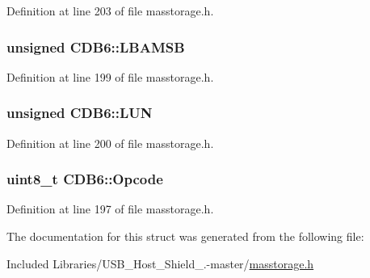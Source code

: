 \-Definition at line 203 of file masstorage.\-h.

\hypertarget{struct_c_d_b6_a1d5e2c34147b5ecc84d20f10e307fd1e}{
\subsubsection[{\-L\-B\-A\-M\-S\-B}]{\setlength{\rightskip}{0pt plus 5cm}unsigned {\bf \-C\-D\-B6\-::\-L\-B\-A\-M\-S\-B}}}\label{struct_c_d_b6_a1d5e2c34147b5ecc84d20f10e307fd1e}


\-Definition at line 199 of file masstorage.\-h.

\hypertarget{struct_c_d_b6_ada1275c63867c75daf71348ec1f8d666}{
\subsubsection[{\-L\-U\-N}]{\setlength{\rightskip}{0pt plus 5cm}unsigned {\bf \-C\-D\-B6\-::\-L\-U\-N}}}\label{struct_c_d_b6_ada1275c63867c75daf71348ec1f8d666}


\-Definition at line 200 of file masstorage.\-h.

\hypertarget{struct_c_d_b6_af2b06ea02758f3096f48da306371a7d8}{
\subsubsection[{\-Opcode}]{\setlength{\rightskip}{0pt plus 5cm}uint8\-\_\-t {\bf \-C\-D\-B6\-::\-Opcode}}}\label{struct_c_d_b6_af2b06ea02758f3096f48da306371a7d8}


\-Definition at line 197 of file masstorage.\-h.



\-The documentation for this struct was generated from the following file\-:\begin{DoxyCompactItemize}
\item 
\-Included Libraries/\-U\-S\-B\-\_\-\-Host\-\_\-\-Shield\-\_.-\/master/\hyperlink{masstorage_8h}{masstorage.\-h}\end{DoxyCompactItemize}
